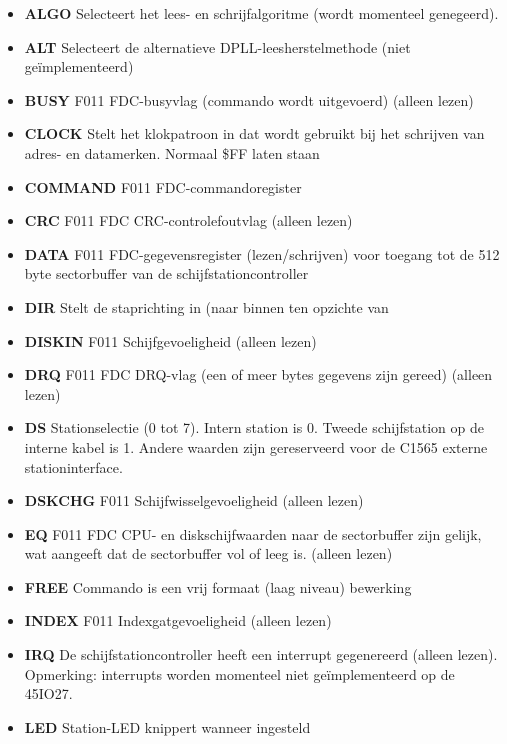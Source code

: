\begin{itemize}
\item{\bf{ALGO}} Selecteert het lees- en schrijfalgoritme (wordt momenteel genegeerd).
\item{\bf{ALT}} Selecteert de alternatieve DPLL-leesherstelmethode (niet geïmplementeerd)
\item{\bf{BUSY}} F011 FDC-busyvlag (commando wordt uitgevoerd) (alleen lezen)
\item{\bf{CLOCK}} Stelt het klokpatroon in dat wordt gebruikt bij het schrijven van adres- en datamerken. Normaal \$FF laten staan
\item{\bf{COMMAND}} F011 FDC-commandoregister
\item{\bf{CRC}} F011 FDC CRC-controlefoutvlag (alleen lezen)
\item{\bf{DATA}} F011 FDC-gegevensregister (lezen/schrijven) voor toegang tot de 512 byte sectorbuffer van de schijfstationcontroller
\item{\bf{DIR}} Stelt de staprichting in (naar binnen ten opzichte van
\item{\bf{DISKIN}} F011 Schijfgevoeligheid (alleen lezen)
\item{\bf{DRQ}} F011 FDC DRQ-vlag (een of meer bytes gegevens zijn gereed) (alleen lezen)
\item{\bf{DS}} Stationselectie (0 tot 7). Intern station is 0. Tweede schijfstation op de interne kabel is 1. Andere waarden zijn gereserveerd voor de C1565 externe stationinterface.
\item{\bf{DSKCHG}} F011 Schijfwisselgevoeligheid (alleen lezen)
\item{\bf{EQ}} F011 FDC CPU- en diskschijfwaarden naar de sectorbuffer zijn gelijk, wat aangeeft dat de sectorbuffer vol of leeg is. (alleen lezen)
\item{\bf{FREE}} Commando is een vrij formaat (laag niveau) bewerking
\item{\bf{INDEX}} F011 Indexgatgevoeligheid (alleen lezen)
\item{\bf{IRQ}} De schijfstationcontroller heeft een interrupt gegenereerd (alleen lezen). Opmerking: interrupts worden momenteel niet geïmplementeerd op de 45IO27.
\item{\bf{LED}} Station-LED knippert wanneer ingesteld

\end{itemize}
